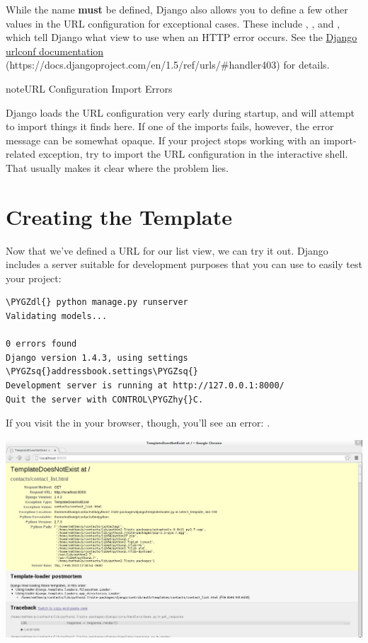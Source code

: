 \documentclass[letterpaper,10pt,english]{sphinxmanual}
\def\PYGZdl{\char`\$}
\def\PYGZhy{\char`\-}
\def\PYGZsq{\char`\'}
\renewcommand\PYGZsq{\textquotesingle}
\begin{document}
While the  name \textbf{must} be defined, Django also allows
you to define a few other values in the URL configuration for
exceptional cases. These include , , and
, which tell Django what view to use when an HTTP error
occurs. See the \href{https://docs.djangoproject.com/en/1.5/ref/urls/\#handler403}{Django urlconf documentation} (https://docs.djangoproject.com/en/1.5/ref/urls/\#handler403) for details.

\begin{notice}{note}{URL Configuration Import Errors}

Django loads the URL configuration very early during startup, and
will attempt to import things it finds here. If one of the imports
fails, however, the error message can be somewhat opaque. If your
project stops working with an import-related exception, try to
import the URL configuration in the interactive shell. That usually
makes it clear where the problem lies.
\end{notice}


\section{Creating the Template}
\label{tutorial/views:creating-the-template}
Now that we've defined a URL for our list view, we can try it out.
Django includes a server suitable for development purposes that you
can use to easily test your project:

\begin{Verbatim}[commandchars=\\\{\}]
\PYGZdl{} python manage.py runserver
Validating models...

0 errors found
Django version 1.4.3, using settings \PYGZsq{}addressbook.settings\PYGZsq{}
Development server is running at http://127.0.0.1:8000/
Quit the server with CONTROL\PYGZhy{}C.
\end{Verbatim}

If you visit the  in your browser, though,
you'll see an error: .

\includegraphics{TemplateDoesNotExist.png}
\end{document}
